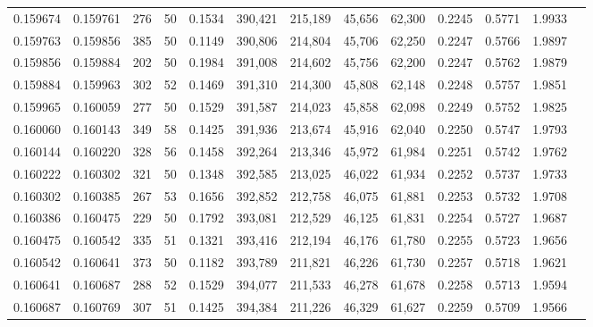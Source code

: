 \begin{tabular}{rrrrrrrrrrrrr}
0.159674 & 0.159761 &   276 &  50 &                                     0.1534 & 390,421 & 215,189 &  45,656 &  62,300 & 0.2245 & 0.5771 & 1.9933 \\
0.159763 & 0.159856 &   385 &  50 &                                     0.1149 & 390,806 & 214,804 &  45,706 &  62,250 & 0.2247 & 0.5766 & 1.9897 \\
0.159856 & 0.159884 &   202 &  50 &                                     0.1984 & 391,008 & 214,602 &  45,756 &  62,200 & 0.2247 & 0.5762 & 1.9879 \\
0.159884 & 0.159963 &   302 &  52 &                                     0.1469 & 391,310 & 214,300 &  45,808 &  62,148 & 0.2248 & 0.5757 & 1.9851 \\
0.159965 & 0.160059 &   277 &  50 &                                     0.1529 & 391,587 & 214,023 &  45,858 &  62,098 & 0.2249 & 0.5752 & 1.9825 \\
0.160060 & 0.160143 &   349 &  58 &                                     0.1425 & 391,936 & 213,674 &  45,916 &  62,040 & 0.2250 & 0.5747 & 1.9793 \\
0.160144 & 0.160220 &   328 &  56 &                                     0.1458 & 392,264 & 213,346 &  45,972 &  61,984 & 0.2251 & 0.5742 & 1.9762 \\
0.160222 & 0.160302 &   321 &  50 &                                     0.1348 & 392,585 & 213,025 &  46,022 &  61,934 & 0.2252 & 0.5737 & 1.9733 \\
0.160302 & 0.160385 &   267 &  53 &                                     0.1656 & 392,852 & 212,758 &  46,075 &  61,881 & 0.2253 & 0.5732 & 1.9708 \\
0.160386 & 0.160475 &   229 &  50 &                                     0.1792 & 393,081 & 212,529 &  46,125 &  61,831 & 0.2254 & 0.5727 & 1.9687 \\
0.160475 & 0.160542 &   335 &  51 &                                     0.1321 & 393,416 & 212,194 &  46,176 &  61,780 & 0.2255 & 0.5723 & 1.9656 \\
0.160542 & 0.160641 &   373 &  50 &                                     0.1182 & 393,789 & 211,821 &  46,226 &  61,730 & 0.2257 & 0.5718 & 1.9621 \\
0.160641 & 0.160687 &   288 &  52 &                                     0.1529 & 394,077 & 211,533 &  46,278 &  61,678 & 0.2258 & 0.5713 & 1.9594 \\
0.160687 & 0.160769 &   307 &  51 &                                     0.1425 & 394,384 & 211,226 &  46,329 &  61,627 & 0.2259 & 0.5709 & 1.9566 \\

\end{tabular}
